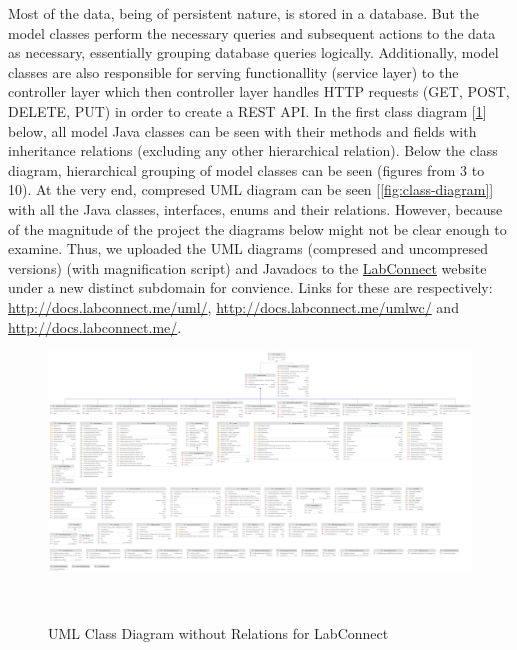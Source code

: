 \documentclass[a4paper, 12pt]{article}
\begin{document}
    Most of the data, being of persistent nature, is stored in a database. But the model classes
    perform the necessary queries and subsequent actions to the data as necessary,
    essentially grouping database queries logically. Additionally, model classes are also responsible for serving
    functionallity (service layer) to the controller layer which then controller layer handles HTTP requests (GET, POST, DELETE, PUT) in order
    to create a REST API. In the first class diagram [\ref{fig:straight-class-diagram}] below, all model Java classes can be seen with their
    methods and fields with inheritance relations (excluding any other hierarchical relation). Below the class diagram, hierarchical grouping of model
    classes can be seen (figures from 3 to 10). At the very end, compresed UML diagram can be seen [\ref{fig:class-diagram}] with all the Java classes,
    interfaces, enums and their relations. However, because of the magnitude of the project
    the diagrams below might not be clear enough to examine. Thus, we uploaded the UML diagrams (compresed and uncompresed versions)
    (with magnification script) and Javadocs to the \href{http://www.labconnect.me}{LabConnect} website under a new distinct subdomain for convience.
    Links for these are respectively: \href{http://docs.labconnect.me/uml/}{http://docs.labconnect.me/uml/}, 
    \href{http://docs.labconnect.me/umlwc/}{http://docs.labconnect.me/umlwc/} and \href{http://docs.labconnect.me/}{http://docs.labconnect.me/}.

    \begin{figure}[H]
        \centering
        \includegraphics[width=\textwidth]{uml-straight.png}
        \caption{UML Class Diagram without Relations for LabConnect}~\label{fig:straight-class-diagram}
    \end{figure}
    
    \pagebreak
\end{document}
